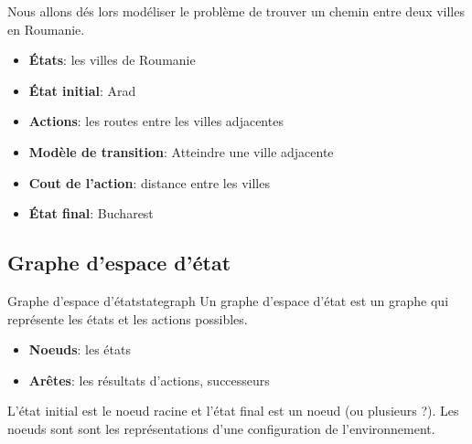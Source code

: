 \begin{example}\leavevmode
    Nous allons dés lors modéliser le problème de trouver un chemin entre deux villes en Roumanie.
    \begin{itemize}
        \item \textbf{États}: les villes de Roumanie
        \item \textbf{État initial}: Arad
        \item \textbf{Actions}: les routes entre les villes adjacentes
        \item \textbf{Modèle de transition}: Atteindre une ville adjacente
        \item \textbf{Cout de l'action}: distance entre les villes
        \item \textbf{État final}: Bucharest 
    \end{itemize}
\end{example}


\subsection{Graphe d'espace d'état} %
\label{sub:graphe_d_espace_d_etat}

\begin{definition}{Graphe d'espace d'état}{stategraph}
    Un graphe d'espace d'état est un graphe qui représente les états et les actions possibles.
    \begin{itemize}
        \item \textbf{Noeuds}: les états
        \item \textbf{Arêtes}: les résultats d'actions, successeurs
    \end{itemize} 
    L'état initial est le noeud racine et l'état final est un noeud (ou plusieurs ?).
    Les noeuds sont sont les représentations d'une configuration de l'environnement.
\end{definition}


